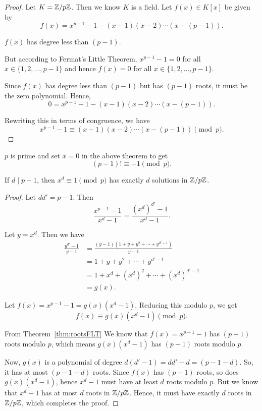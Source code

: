 \begin{proof}
    Let $K = \mathbb{Z}/p\mathbb{Z}$. Then we know $K$ is a field. Let $f(x) \in K[x]$ be given by \[f(x) = x^{p-1} - 1 - (x-1)(x-2) \cdots (x-(p-1)).\]

    $f(x)$ has degree less than $(p-1)$.

    But according to Fermat's Little Theorem, $x^{p-1} - 1 =0$ for all $x \in \{1, 2, ..., p-1\}$ and hence $f(x) = 0$ for all $x \in \{1, 2, ..., p-1\}$.

    Since $f(x)$ has degree less than $(p-1)$ but has $(p-1)$ roots, it must be the zero polynomial. Hence, \[0 = x^{p-1} - 1 - (x - 1)(x - 2) \cdots (x - (p-1)).\]

    Rewriting this in terms of congruence, we have \[x^{p-1} - 1 \equiv (x - 1)(x - 2) \cdots (x - (p-1)) \pmod{p}.\]
\end{proof}

\begin{corollary}
    $p$ is prime and set $x = 0$ in the above theorem to get \[(p-1)! \equiv -1 \pmod{p}.\]
\end{corollary}
\begin{prop}\label{prop:dp-1}
    If $d \mid p-1$, then $x^d \equiv 1 \pmod{p}$ has exactly $d$ solutions in $\mathbb{Z}/p\mathbb{Z}$.
\end{prop}
\begin{proof}
    Let $dd' = p-1$. Then \[\frac{x^{p-1}-1}{x^d-1} = \frac{(x^d)^{d'}-1}{x^d-1}.\]

    Let $y = x^d$. Then we have \begin{align*}
        \frac{y^{d'}-1}{y-1} &= \frac{(y-1)(1 + y + y^2 + \cdots + y^{d'-1})}{y-1}\\
                             &= 1 + y + y^2 + \cdots + y^{d'-1}\\
                             &= 1 + x^d + (x^d)^2 + \cdots + (x^d)^{d'-1}\\
                             &= g(x).
    \end{align*}
    
    Let $f(x) = x^{p-1}-1 = g(x)(x^d-1)$. Reducing this modulo $p$, we get 
    \[f(x) \equiv g(x)(x^d-1) \pmod{p}.\]

    From Theorem~\ref{thm:rootsFLT} We know that $f(x) = x^{p-1} - 1$ has $(p-1)$ roots modulo $p$, which means $g(x)(x^d-1)$ has $(p-1)$ roots modulo $p$.

    Now, $g(x)$ is a polynomial of degree $d(d'-1) = dd' - d = (p -1 - d)$. So, it has at most $(p-1-d)$ roots. Since $f(x)$ has $(p-1)$ roots, so does $g(x)(x^d-1)$, hence $x^d-1$ must have at least $d$ roots modulo $p$. But we know that $x^d-1$ has at most $d$ roots in $\mathbb{Z}/p\mathbb{Z}$. Hence, it must have exactly $d$ roots in $\mathbb{Z}/p\mathbb{Z}$, which completes the proof.
\end{proof}




